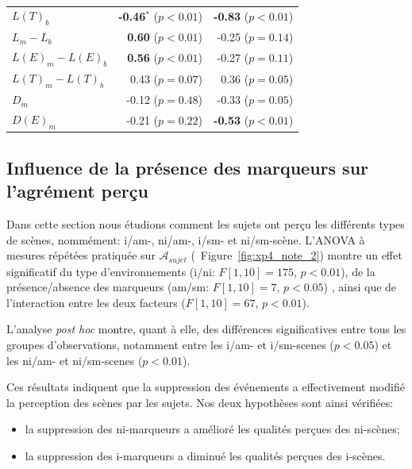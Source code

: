\begin{table}[t]
\begin{tabular}{l r r}
$L(T)_b$           & \textbf{-0.46$^{*}$} ($p<0.01$) & \textbf{-0.83} ($p<0.01$) \\
$L_m-L_b$          & \textbf{0.60} ($p<0.01$)        & -0.25 ($p=0.14$) \\
$L(E)_m-L(E)_b$    & \textbf{0.56} ($p<0.01$)        & -0.27 ($p=0.11$) \\
$L(T)_m-L(T)_b$    & 0.43 ($p=0.07$)                 & 0.36 ($p=0.05$) \\
$D_m$              & -0.12 ($p=0.48$)                & -0.33 ($p=0.05$) \\
$D(E)_m$           & -0.21 ($p=0.22$)                & \textbf{-0.53} ($p<0.01$) \\
\hline
\end{tabular}
\vspace{0.5mm}
\caption{}
\label{tab:corrAmXP4}
\end{table}

\subsection{Influence de la présence des marqueurs sur l'agrément perçu}
\label{sec:ch5_Asujet}

Dans cette section nous étudions comment les sujets ont perçu les différents types de scènes, nommément: i/am-, ni/am-, i/sm- et ni/sm-scène. L'ANOVA à mesures répétées pratiquée sur $\mathcal{A}_{sujet}$ (\cf~Figure~\ref{fig:xp4_note_2}) montre un effet significatif du type d'environnements (i/ni: $F[1,10]=175$, $p<0.01$), de la présence/absence des marqueurs (am/sm: $F[1,10]=7$, $p<0.05$) , ainsi que de l'interaction entre les deux facteurs ($F[1,10]=67$, $p<0.01$).

L'analyse \emph{post hoc} montre, quant à elle, des différences significatives entre tous les groupes d'observations, notamment entre les i/am- et i/sm-scenes ($p<0.05$) et les ni/am- et ni/sm-scenes ($p<0.01$).


Ces résultats indiquent que la suppression des événements a effectivement modifié la perception des scènes par les sujets. Nos deux hypothèses sont ainsi vérifiées:

\begin{itemize}
\item la suppression des ni-marqueurs a amélioré les qualités perçues des ni-scènes;
\item la suppression des i-marqueurs a diminué les qualités perçues des i-scènes.
\end{itemize}

